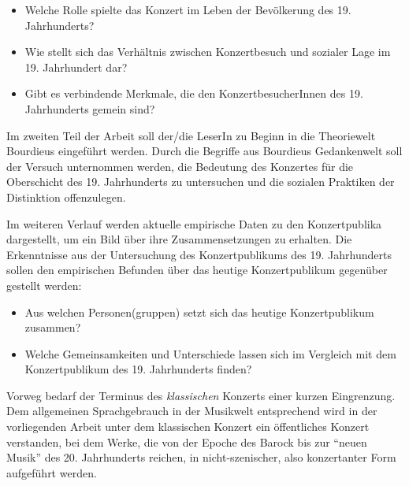 \documentclass[a4paper, german, oneside]{scrbook}
\begin{document}
\begin{itemize}
	\item Welche Rolle spielte das Konzert im Leben der Bevölkerung des 19. Jahrhunderts? %
	\item Wie stellt sich das Verhältnis zwischen Konzertbesuch und sozialer Lage im 19. Jahrhundert dar?
	\item Gibt es verbindende Merkmale, die den KonzertbesucherInnen des 19. Jahrhunderts gemein sind?
\end{itemize}

Im zweiten Teil der Arbeit soll der/die LeserIn zu Beginn in die Theoriewelt Bourdieus eingeführt werden. Durch die Begriffe aus Bourdieus Gedankenwelt soll der Versuch unternommen werden, die Bedeutung des Konzertes für die Oberschicht des 19. Jahrhunderts zu untersuchen und die sozialen Praktiken der Distinktion offenzulegen.

Im weiteren Verlauf werden aktuelle empirische Daten zu den Konzertpublika dargestellt, um ein Bild über ihre Zusammensetzungen zu erhalten. Die Erkenntnisse aus der Untersuchung des Konzertpublikums des 19. Jahrhunderts sollen den empirischen Befunden über das heutige Konzertpublikum gegenüber gestellt werden:

\begin{itemize}
	\item Aus welchen Personen(gruppen) setzt sich das heutige Konzertpublikum zusammen?
	\item Welche Gemeinsamkeiten und Unterschiede lassen sich im Vergleich mit dem Konzertpublikum des 19. Jahrhunderts finden?
\end{itemize}

Vorweg bedarf der Terminus des \emph{klassischen} Konzerts einer kurzen Eingrenzung. Dem allgemeinen Sprachgebrauch in der Musikwelt entsprechend wird in der vorliegenden Arbeit unter dem klassischen Konzert ein öffentliches Konzert verstanden, bei dem Werke, die von der Epoche des Barock bis zur \enquote{neuen Musik} des 20. Jahrhunderts reichen, in nicht-szenischer, also konzertanter Form aufgeführt werden. 

\end{document}

